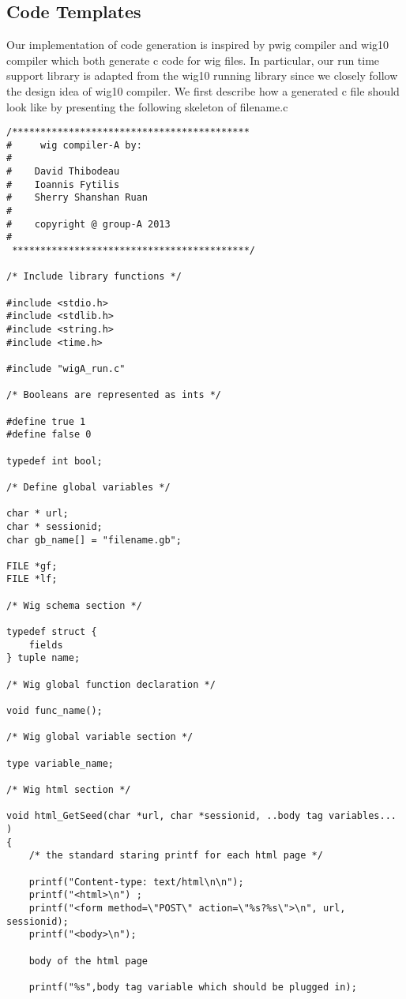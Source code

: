 \documentclass{WigReport}
\begin{document}
\subsection{Code Templates}
Our implementation of code generation is inspired by pwig compiler and wig10 compiler which both generate c code for wig files. In particular, our run time support library is adapted from the wig10 running library since we closely follow the design idea of wig10 compiler. We first describe how a generated c file should look like by presenting the following skeleton of filename.c
\begin{verbatim}
/******************************************
#     wig compiler-A by:
#
#    David Thibodeau
#    Ioannis Fytilis
#    Sherry Shanshan Ruan
#  
#    copyright @ group-A 2013
#
 ******************************************/

/* Include library functions */

#include <stdio.h>
#include <stdlib.h>
#include <string.h>
#include <time.h>

#include "wigA_run.c"

/* Booleans are represented as ints */

#define true 1
#define false 0

typedef int bool;

/* Define global variables */

char * url;
char * sessionid;
char gb_name[] = "filename.gb";

FILE *gf;
FILE *lf;

/* Wig schema section */

typedef struct {
	fields
} tuple name;

/* Wig global function declaration */

void func_name();

/* Wig global variable section */

type variable_name;

/* Wig html section */

void html_GetSeed(char *url, char *sessionid, ..body tag variables... )
{
    /* the standard staring printf for each html page */

    printf("Content-type: text/html\n\n");
    printf("<html>\n") ;
    printf("<form method=\"POST\" action=\"%s?%s\">\n", url, sessionid);
    printf("<body>\n");

    body of the html page
    
    printf("%s",body tag variable which should be plugged in);


\end{verbatim}
\end{document}
